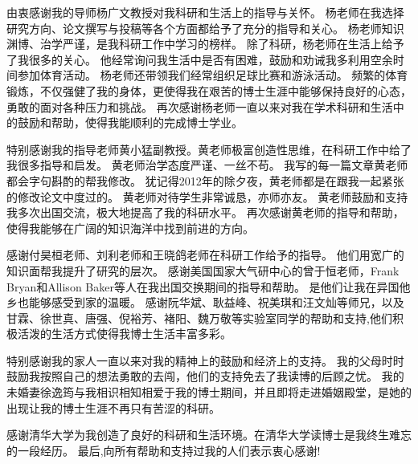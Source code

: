 \begin{acknowledgement}
  由衷感谢我的导师杨广文教授对我科研和生活上的指导与关怀。
  杨老师在我选择研究方向、论文撰写与投稿等各个方面都给予了充分的指导和关心。
  杨老师知识渊博、治学严谨，是我科研工作中学习的榜样。
  除了科研，杨老师在生活上给予了我很多的关心。
  他经常询问我生活中是否有困难，鼓励和劝诫我多利用空余时间参加体育活动。
  杨老师还带领我们经常组织足球比赛和游泳活动。
  频繁的体育锻炼，不仅强健了我的身体，更使得我在艰苦的博士生涯中能够保持良好的心态，勇敢的面对各种压力和挑战。 
  再次感谢杨老师一直以来对我在学术科研和生活中的鼓励和帮助，使得我能顺利的完成博士学业。

  特别感谢我的指导老师黄小猛副教授。黄老师极富创造性思维，在科研工作中给了我很多指导和启发。 
  黄老师治学态度严谨、一丝不苟。
  我写的每一篇文章黄老师都会字句斟酌的帮我修改。
  犹记得2012年的除夕夜，黄老师都是在跟我一起紧张的修改论文中度过的。
  黄老师对待学生非常诚恳，亦师亦友。 
  黄老师鼓励和支持我多次出国交流，极大地提高了我的科研水平。
  再次感谢黄老师的指导和帮助，使得我能够在广阔的知识海洋中找到前进的方向。


  感谢付昊桓老师、刘利老师和王晓鸽老师在科研工作给予的指导。 
  他们用宽广的知识面帮我提升了研究的层次。
  感谢美国国家大气研中心的曾于恒老师，Frank Bryan和Allison Baker等人在我出国交换期间的指导和帮助。
  是他们让我在异国他乡也能够感受到家的温暖。
  感谢阮华斌、耿益峰、祝美琪和汪文灿等师兄，以及甘霖、徐世真、唐强、倪裕芳、褚阳、魏万敬等实验室同学的帮助和支持,他们积极活泼的生活方式使得我博士生活丰富多彩。 

  
  特别感谢我的家人一直以来对我的精神上的鼓励和经济上的支持。
  我的父母时时鼓励我按照自己的想法勇敢的去闯，他们的支持免去了我读博的后顾之忧。
  我的未婚妻徐逸筠与我相识相知相爱于我的博士期间，并且即将走进婚姻殿堂，是她的出现让我的博士生涯不再只有苦涩的科研。
  
  感谢清华大学为我创造了良好的科研和生活环境。在清华大学读博士是我终生难忘的一段经历。
  最后,向所有帮助和支持过我的人们表示衷心感谢!

\end{acknowledgement}
